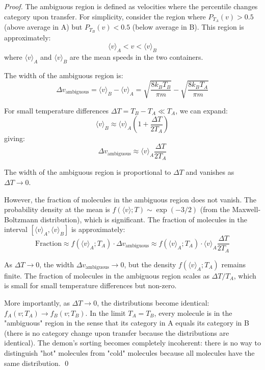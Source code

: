 \documentclass[12pt,a4paper]{article}
\theoremstyle{definition}
\theoremstyle{remark}
\begin{document}
\begin{proof}
The ambiguous region is defined as velocities where the percentile changes category upon transfer. For simplicity, consider the region where $P_{T_A}(v) > 0.5$ (above average in A) but $P_{T_B}(v) < 0.5$ (below average in B). This region is approximately:
\begin{equation}
\langle v \rangle_A < v < \langle v \rangle_B
\end{equation}
where $\langle v \rangle_A$ and $\langle v \rangle_B$ are the mean speeds in the two containers.

The width of the ambiguous region is:
\begin{equation}
\Delta v_{\text{ambiguous}} = \langle v \rangle_B - \langle v \rangle_A = \sqrt{\frac{8k_B T_B}{\pi m}} - \sqrt{\frac{8k_B T_A}{\pi m}}
\end{equation}

For small temperature differences $\Delta T = T_B - T_A \ll T_A$, we can expand:
\begin{equation}
\langle v \rangle_B \approx \langle v \rangle_A \left(1 + \frac{\Delta T}{2T_A}\right)
\end{equation}
giving:
\begin{equation}
\Delta v_{\text{ambiguous}} \approx \langle v \rangle_A \frac{\Delta T}{2T_A}
\end{equation}

The width of the ambiguous region is proportional to $\Delta T$ and vanishes as $\Delta T \to 0$.

However, the fraction of molecules in the ambiguous region does not vanish. The probability density at the mean is $f(\langle v \rangle; T) \sim \exp(-3/2)$ (from the Maxwell-Boltzmann distribution), which is significant. The fraction of molecules in the interval $[\langle v \rangle_A, \langle v \rangle_B]$ is approximately:
\begin{equation}
\text{Fraction} \approx f(\langle v \rangle_A; T_A) \cdot \Delta v_{\text{ambiguous}} \approx f(\langle v \rangle_A; T_A) \cdot \langle v \rangle_A \frac{\Delta T}{2T_A}
\end{equation}

As $\Delta T \to 0$, the width $\Delta v_{\text{ambiguous}} \to 0$, but the density $f(\langle v \rangle_A; T_A)$ remains finite. The fraction of molecules in the ambiguous region scales as $\Delta T / T_A$, which is small for small temperature differences but non-zero.

More importantly, as $\Delta T \to 0$, the distributions become identical: $f_A(v; T_A) \to f_B(v; T_B)$. In the limit $T_A = T_B$, every molecule is in the "ambiguous" region in the sense that its category in A equals its category in B (there is no category change upon transfer because the distributions are identical). The demon's sorting becomes completely incoherent: there is no way to distinguish "hot" molecules from "cold" molecules because all molecules have the same distribution. \qed
\end{proof}
\end{document}
